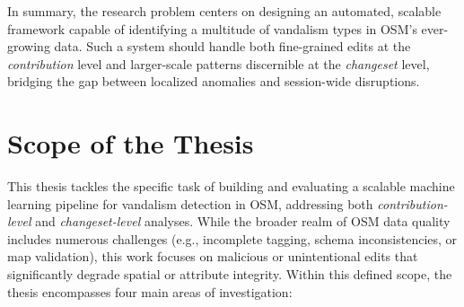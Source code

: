 \documentclass[
    13pt, %
    a4paper, %
    listof=totoc, %
    bibliography=totoc, %
    index=totoc, %
    headsepline
]{scrreprt}
\begin{document}
In summary, the research problem centers on designing an automated, scalable framework capable of identifying a multitude of vandalism types in OSM’s ever-growing data. Such a system should handle both fine-grained edits at the \emph{contribution} level and larger-scale patterns discernible at the \emph{changeset} level, bridging the gap between localized anomalies and session-wide disruptions.

\section{Scope of the Thesis}
\label{sec:thesis_scope}

This thesis tackles the specific task of building and evaluating a scalable machine learning pipeline for vandalism detection in OSM, addressing both \emph{contribution-level} and \emph{changeset-level} analyses. While the broader realm of OSM data quality includes numerous challenges (e.g., incomplete tagging, schema inconsistencies, or map validation), this work focuses on malicious or unintentional edits that significantly degrade spatial or attribute integrity. Within this defined scope, the thesis encompasses four main areas of investigation:
\end{document}

